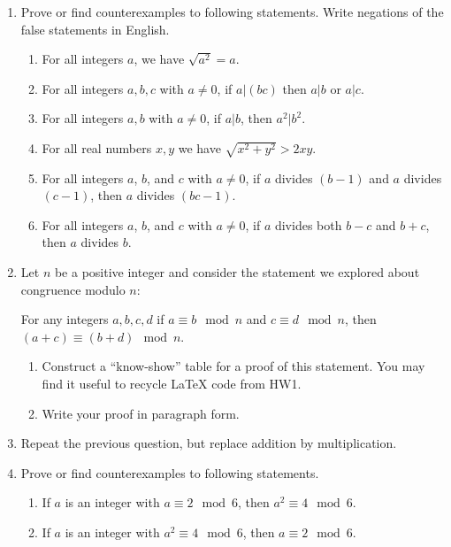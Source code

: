 \documentclass[12pt]{article}
\begin{document}
\begin{enumerate}
\item Prove or find counterexamples to following statements.
      Write negations of the false statements in English.
  \begin{enumerate}
  \item  For all integers $a$, we have $\sqrt{a^2}=a$.
  \item  For all integers $a,b,c$ with $a\neq 0$, if $a|(bc)$ then $a|b$ or $a|c$.
  \item  For all integers $a,b$ with $a\neq 0$, if $a|b$, then $a^2|b^2$.
  \item  For all real numbers $x,y$ we have $\sqrt{x^2+y^2}>2xy$.
  \item  For all integers $a$, $b$, and $c$ with $a\neq 0$, if $a$ divides $(b-1)$ and $a$ divides $(c-1)$, then
    $a$ divides $(bc-1)$.
  \item For all integers $a$, $b$, and $c$ with $a\neq 0$, if $a$ divides  both $b-c$ and $b+c$, then  $a$ divides $b$.
  \end{enumerate}

\item Let $n$ be a positive integer and consider the statement we explored about congruence modulo $n$:

  For any integers $a,b,c,d$ if $a\equiv b \mod n$ and $c\equiv d\mod n$, then
    $(a+c)\equiv (b+d) \mod n$.
  
  \begin{enumerate}
  \item  Construct a ``know-show'' table for a proof of this statement.
         You may find it useful to recycle LaTeX code from HW1.
   \item  Write your proof in paragraph form.  
  \end{enumerate}


\item Repeat the previous question, but replace addition by multiplication.

\item Prove or find counterexamples to following statements.
  \begin{enumerate}
  \item  If $a$ is an integer with $a\equiv 2 \mod 6$, then $a^2 \equiv 4 \mod 6$.
  \item  If $a$ is an integer with $a^2 \equiv 4 \mod 6$, then  $a\equiv 2 \mod 6$.
  \end{enumerate}



\end{enumerate}
\end{document}
